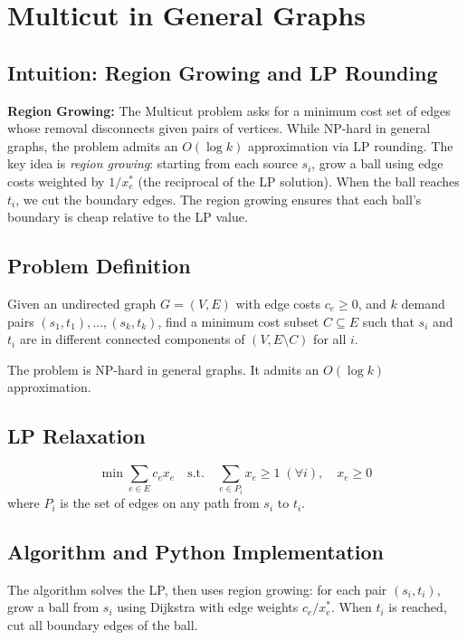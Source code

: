 \setcounter{chapter}{19}
\chapter{Multicut in General Graphs}
\label{ch:multicut_general}

\section{Intuition: Region Growing and LP Rounding}

\begin{intuitionbox}
\textbf{Region Growing:} The Multicut problem asks for a minimum cost set of edges whose removal disconnects given pairs of vertices. While NP-hard in general graphs, the problem admits an $O(\log k)$ approximation via LP rounding. The key idea is \emph{region growing}: starting from each source $s_i$, grow a ball using edge costs weighted by $1/x_e^*$ (the reciprocal of the LP solution). When the ball reaches $t_i$, we cut the boundary edges. The region growing ensures that each ball's boundary is cheap relative to the LP value.
\end{intuitionbox}

\section{Problem Definition}
Given an undirected graph $G = (V, E)$ with edge costs $c_e \ge 0$, and $k$ demand pairs $(s_1, t_1), \dots, (s_k, t_k)$, find a minimum cost subset $C \subseteq E$ such that $s_i$ and $t_i$ are in different connected components of $(V, E \setminus C)$ for all $i$.

The problem is NP-hard in general graphs. It admits an $O(\log k)$ approximation.

\section{LP Relaxation}
\[
\min \sum_{e \in E} c_e x_e \quad \text{s.t.} \quad \sum_{e \in P_i} x_e \ge 1 \; (\forall i), \quad x_e \ge 0
\]
where $P_i$ is the set of edges on any path from $s_i$ to $t_i$.

\section{Algorithm and Python Implementation}
The algorithm solves the LP, then uses region growing: for each pair $(s_i, t_i)$, grow a ball from $s_i$ using Dijkstra with edge weights $c_e / x_e^*$. When $t_i$ is reached, cut all boundary edges of the ball.

